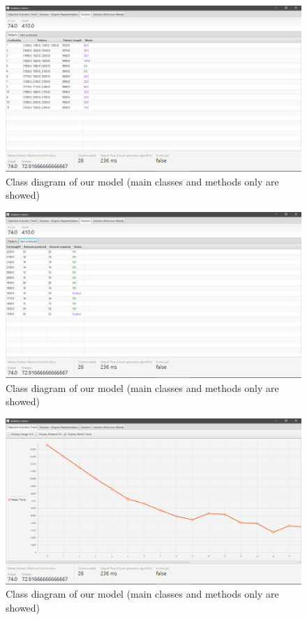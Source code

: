 \documentclass[10pt,a4paper]{article}
\begin{document}
\begin{figure}[H]
\includegraphics[width=\textwidth]{./images/sol1.png}
\centering
\caption{Class diagram of our model (main classes and methods only are showed)}

\end{figure}


\begin{figure}[H]
\includegraphics[width=\textwidth]{./images/sol2.png}
\centering
\caption{Class diagram of our model (main classes and methods only are showed)}

\end{figure}

\begin{figure}[H]
\includegraphics[width=\textwidth]{./images/waste.png}
\centering
\caption{Class diagram of our model (main classes and methods only are showed)}

\end{figure}
\end{document}
